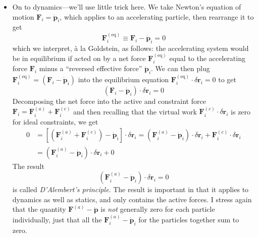 \documentclass[11pt, a4paper]{article}
\newcommand{\bdot}[1]{\dot{\bm{#1}}} %
\begin{document}
\begin{itemize}
	
	\item On to dynamics---we'll use little trick here. We take Newton's equation of motion $ \bm{F}_{i} = \bdot{p}_{i} $, which applies to an accelerating particle, then rearrange it to get
	\begin{equation*}
		\bm{F}_{i}^{(\text{eq})} \equiv \bm{F}_{i} - \bdot{p}_{i} = 0
	\end{equation*}
	which we interpret, \`{a} la Goldstein, as follows: the accelerating system would be in equilibrium if acted on by a net force $ \bm{F}_{i}^{(\text{eq})} $ equal to the accelerating force $ \bm{F}_{i} $ minus a ``reversed effective force'' $ \bdot{p}_{i} $. We can then plug $\bm{F}_{i}^{(\text{eq})} = \left(\bm{F}_{i} - \bdot{p}_{i}\right) $ into the equilibrium equation $ \bm{F}_{i}^{(\text{eq})} \cdot \delta \bm{r}_{i} = 0 $ to get
	\begin{equation*}
		\left(\bm{F}_{i} - \bdot{p}_{i}\right) \cdot \delta \bm{r}_{i} = 0
	\end{equation*}
	Decomposing the net force into the active and constraint force $ \bm{F}_{i} = \bm{F}_{i}^{(a)} + \bm{F}_{i}^{(c)} $ and then recalling that the virtual work $ \bm{F}_{i}^{(c)}\cdot \delta   \bm{r}_{i} $ is zero for ideal constraints, we get 
	\begin{align*}
		0 &= \left[ \left(\bm{F}_{i}^{(a)} + \bm{F}_{i}^{(c)}\right) - \bdot{p}_{i}\right] \cdot \delta \bm{r}_{i} = \left( \bm{F}_{i}^{(a)} - \bdot{p}_{i}\right) \cdot \delta \bm{r}_{i} + \bm{F}_{i}^{(c)}\cdot \delta \bm{r}_{i} \\
		&= \left( \bm{F}_{i}^{(a)} - \bdot{p}_{i}\right) \cdot \delta \bm{r}_{i} + 0
	\end{align*}
	The result
	\begin{equation*}
		\left( \bm{F}_{i}^{(a)} - \bdot{p}_{i}\right) \cdot \delta \bm{r}_{i}= 0
	\end{equation*}
	is called \textit{D'Alembert's principle}. The result is important in that it applies to dynamics as well as statics, and only contains the active forces. I stress again that the quantity $ \bm{F}^{(a)} - \bdot{p} $ is \textit{not} generally zero for each particle individually, just that all the $ \bm{F}_{i}^{(a)} - \bdot{p}_{i} $ for the particles together sum to zero.
	
\end{itemize}
\end{document}
